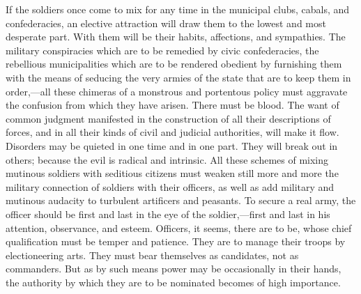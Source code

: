 If the soldiers once come to mix for any time in the municipal clubs, cabals, and confederacies, an elective attraction will draw them to the lowest and most desperate part. With them will be their habits, affections, and sympathies. The military conspiracies which are to be remedied by civic confederacies, the rebellious municipalities which are to be rendered obedient by furnishing them with the means of seducing the very armies of the state that are to keep them in order,—all these chimeras of a monstrous and portentous policy must aggravate the confusion from which they have arisen. There must be blood. The want of common judgment manifested in the construction of all their descriptions of forces, and in all their kinds of civil and judicial authorities, will make it flow. Disorders may be quieted in one time and in one part. They will break out in others; because the evil is radical and intrinsic. All these schemes of mixing mutinous soldiers with seditious citizens must weaken still more and more the military connection of soldiers with their officers, as well as add military and mutinous audacity to turbulent artificers and peasants. To secure a real army, the officer should be first and last in the eye of the soldier,—first and last in his attention, observance, and esteem. Officers, it seems, there are to be, whose chief qualification must be temper and patience. They are to manage their troops by electioneering arts. They must bear themselves as candidates, not as commanders. But as by such means power may be occasionally in their hands, the authority by which they are to be nominated becomes of high importance.

